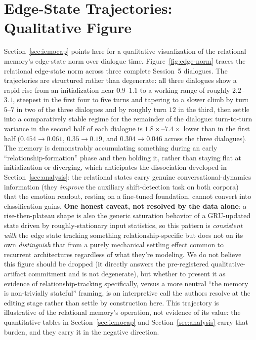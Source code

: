 


\section{Edge-State Trajectories: Qualitative Figure}
\label{sec:appendix-edge-norm}

Section~\ref{sec:iemocap} points here for a qualitative visualization of the relational memory's edge-state norm over dialogue time. Figure~\ref{fig:edge-norm} traces the relational edge-state norm across three complete Session~5 dialogues. The trajectories are structured rather than degenerate: all three dialogues show a rapid rise from an initialization near $0.9$--$1.1$ to a working range of roughly $2.2$--$3.1$, steepest in the first four to five turns and tapering to a slower climb by turn $5$--$7$ in two of the three dialogues and by roughly turn $12$ in the third, then settle into a comparatively stable regime for the remainder of the dialogue: turn-to-turn variance in the second half of each dialogue is $1.8\times$--$7.4\times$ lower than in the first half ($0.454\to0.061$, $0.35\to0.19$, and $0.304\to0.046$ across the three dialogues). The memory is demonstrably accumulating something during an early ``relationship-formation'' phase and then holding it, rather than staying flat at initialization or diverging, which anticipates the dissociation developed in Section~\ref{sec:analysis}: the relational states carry genuine conversational-dynamics information (they \textit{improve} the auxiliary shift-detection task on both corpora) that the emotion readout, resting on a fine-tuned foundation, cannot convert into classification gains. \textbf{One honest caveat, not resolved by the data alone}: a rise-then-plateau shape is also the generic saturation behavior of a GRU-updated state driven by roughly-stationary input statistics, so this pattern is \textit{consistent with} the edge state tracking something relationship-specific but does not on its own \textit{distinguish} that from a purely mechanical settling effect common to recurrent architectures regardless of what they're modeling. We do not believe this figure should be dropped (it directly answers the pre-registered qualitative-artifact commitment and is not degenerate), but whether to present it as evidence of relationship-tracking specifically, versus a more neutral ``the memory is non-trivially stateful'' framing, is an interpretive call the authors resolve at the editing stage rather than settle by construction here. This trajectory is illustrative of the relational memory's operation, not evidence of its value: the quantitative tables in Section~\ref{sec:iemocap} and Section~\ref{sec:analysis} carry that burden, and they carry it in the negative direction.

